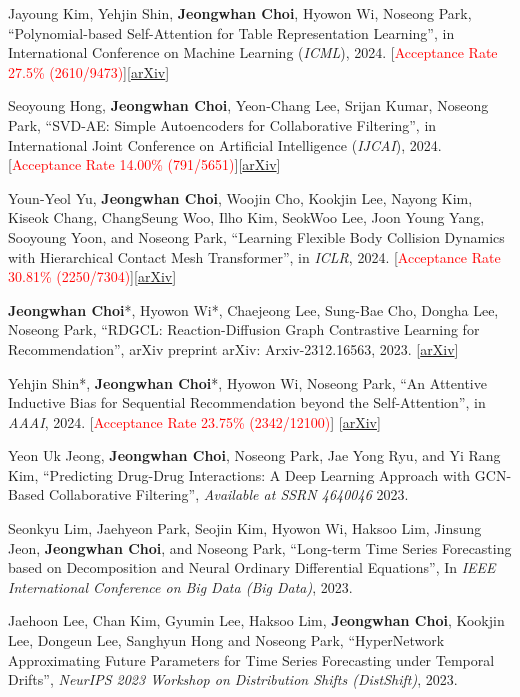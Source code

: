 \documentclass[10pt]{article}
\newenvironment{changemargin}[2]{
  \begin{list}{}{
    \setlength{\topsep}{0pt}
    \setlength{\leftmargin}{#1}
    \setlength{\rightmargin}{#2}
    \setlength{\listparindent}{\parindent}
    \setlength{\itemindent}{\parindent}
    \setlength{\parsep}{\parskip}
  }
  \item[]}{\end{list}
}
\newcommand{\presentation}[2]{
	{#1} \hfill \emph{#2}\\ \bigskip
}
\newcommand{\RED}[1]{\textcolor{red}{#1}}
\newenvironment{body} {
	\vspace*{-16pt}
	\begin{changemargin}{-0.25in}{-0.5in}
  }
	{\end{changemargin}
}
\begin{document}
\begin{body}
 \presentation{
Jayoung Kim, Yehjin Shin, \textbf{Jeongwhan Choi}, Hyowon Wi, Noseong Park, ``Polynomial-based Self-Attention for Table Representation Learning'',  in International Conference on Machine Learning (\textit{ICML}), 2024. [\RED{Acceptance Rate 27.5\% (2610/9473)}][\href{https://arxiv.org/abs/2312.07753}{arXiv}]}{}

\presentation{
 Seoyoung Hong, \textbf{Jeongwhan Choi}, Yeon-Chang Lee, Srijan Kumar, Noseong Park, ``SVD-AE: Simple Autoencoders for Collaborative Filtering'', in International Joint Conference on Artificial Intelligence (\textit{IJCAI}), 2024. [\RED{Acceptance Rate 14.00\% (791/5651)}][\href{https://arxiv.org/abs/2405.04746}{arXiv}]}{}

\presentation{
 Youn-Yeol Yu, \textbf{Jeongwhan Choi}, Woojin Cho, Kookjin Lee, Nayong Kim, Kiseok Chang, ChangSeung Woo, Ilho Kim, SeokWoo Lee, Joon Young Yang, Sooyoung Yoon, and Noseong Park, ``Learning Flexible Body Collision Dynamics with Hierarchical Contact Mesh Transformer'',  in \textit{ICLR}, 2024. [\RED{Acceptance Rate  30.81\% (2250/7304)}][\href{https://arxiv.org/abs/2312.12467}{arXiv}]}{}
 
\presentation{
\textbf{Jeongwhan Choi}*, Hyowon Wi*, Chaejeong Lee, Sung-Bae Cho, Dongha Lee, Noseong Park, ``RDGCL: Reaction-Diffusion Graph Contrastive Learning for Recommendation'',  arXiv preprint arXiv: Arxiv-2312.16563, 2023. [\href{https://arxiv.org/abs/2312.16563}{arXiv}]}{}

\presentation{
 Yehjin Shin*, \textbf{Jeongwhan Choi}*, Hyowon Wi, Noseong Park, ``An Attentive Inductive Bias for Sequential Recommendation beyond the Self-Attention'',  in \textit{AAAI}, 2024. [\RED{Acceptance Rate 23.75\% (2342/12100)}] [\href{https://arxiv.org/abs/2312.10325}{arXiv}]}{}

\presentation{
Yeon Uk Jeong, \textbf{Jeongwhan Choi}, Noseong Park, Jae Yong Ryu, and Yi Rang Kim, ``Predicting Drug-Drug Interactions: A Deep Learning Approach with GCN-Based Collaborative Filtering'', \textit{Available at SSRN 4640046} 2023.}{}

\presentation{
 Seonkyu Lim, Jaehyeon Park, Seojin Kim, Hyowon Wi, Haksoo Lim, Jinsung Jeon, \textbf{Jeongwhan Choi}, and Noseong Park, ``Long-term Time Series Forecasting based on Decomposition and Neural Ordinary Differential Equations'', In \emph{IEEE International Conference on Big Data (Big Data)}, 2023.}{}

\presentation{
Jaehoon Lee, Chan Kim, Gyumin Lee, Haksoo Lim, \textbf{Jeongwhan Choi}, Kookjin Lee, Dongeun Lee, Sanghyun Hong and Noseong Park, ``HyperNetwork Approximating Future Parameters for Time Series Forecasting under Temporal Drifts'', \emph{NeurIPS 2023 Workshop on Distribution Shifts (DistShift)}, 2023.}{}


\end{body}
\end{document}
